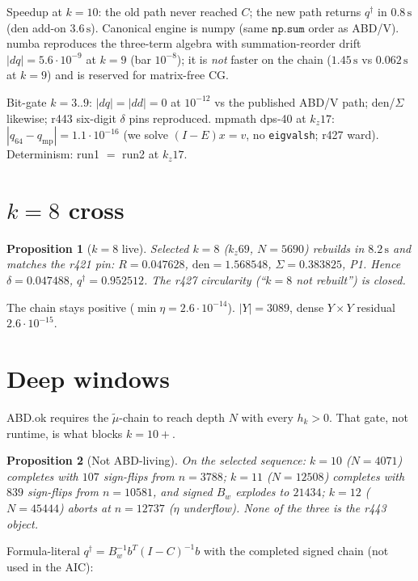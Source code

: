 \documentclass[11pt]{article}
\newtheorem{prop}{Proposition}
\newcommand{\qd}{q^{\dagger}}
\begin{document}
Speedup at $k=10$: the old path never reached $C$;
the new path returns $\qd$ in $0.8\,\mathrm{s}$
(den add-on $3.6\,\mathrm{s}$).
Canonical engine is numpy (same $\mathtt{np.sum}$
order as ABD/V).
numba reproduces the three-term algebra with
summation-reorder drift $|dq|=5.6\cdot 10^{-9}$ at
$k=9$ (bar $10^{-8}$); it is \emph{not} faster on
the chain ($1.45\,\mathrm{s}$ vs $0.062\,\mathrm{s}$
at $k=9$) and is reserved for matrix-free CG.

Bit-gate $k=3..9$: $|dq|=|dd|=0$ at $10^{-12}$ vs
the published ABD/V path; den/$\Sigma$ likewise;
r443 six-digit $\delta$ pins reproduced.
mpmath dps-40 at $k_z17$: $|q_{64}-q_{\mathrm{mp}}|=1.1\cdot 10^{-16}$
(we solve $(I-E)x=v$, no \texttt{eigvalsh}; r427
ward).
Determinism: run1 $=$ run2 at $k_z17$.

\section{$k=8$ cross}\label{sec:k8}

\begin{prop}[$k=8$ live]\label{prop:k8}
Selected $k=8$ ($k_z69$, $N=5690$) rebuilds in
$8.2\,\mathrm{s}$ and matches the r421 pin:
$R=0.047628$, $\mathrm{den}=1.568548$,
$\Sigma=0.383825$, P1.
Hence $\delta=0.047488$, $\qd=0.952512$.
The r427 circularity (``$k=8$ not rebuilt'') is
closed.
\end{prop}

The chain stays positive ($\min\eta=2.6\cdot 10^{-14}$).
$|Y|=3089$, dense $Y\times Y$ residual $2.6\cdot 10^{-15}$.

\section{Deep windows}\label{sec:deep}

ABD.ok requires the $\tilde\mu$-chain to reach
depth $N$ with every $h_k>0$.
That gate, not runtime, is what blocks $k=10+$.

\begin{prop}[Not ABD-living]\label{prop:deep}
On the selected sequence:
$k=10$ ($N=4071$) completes with $107$ sign-flips
from $n=3788$;
$k=11$ ($N=12508$) completes with $839$ sign-flips
from $n=10581$, and signed $B_w$ explodes to
$21434$;
$k=12$ ($N=45444$) aborts at $n=12737$
($\eta$ underflow).
None of the three is the r443 object.
\end{prop}

Formula-literal $\qd=B_w^{-1}b^{T}(I-C)^{-1}b$
with the completed signed chain (not used in the
AIC):
\end{document}
